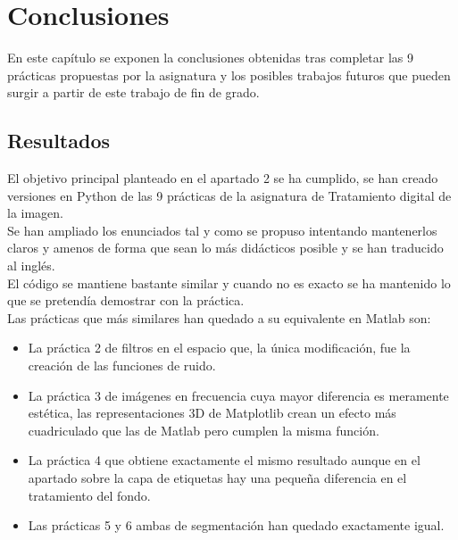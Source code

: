 \chapter{Conclusiones}
En este capítulo se exponen la conclusiones obtenidas tras completar las 9 prácticas propuestas por la asignatura y los posibles trabajos futuros que pueden surgir a partir de este trabajo de fin de grado. 

\section{Resultados}
El objetivo principal planteado en el apartado 2 se ha cumplido, se han creado versiones en Python de las 9 prácticas de la asignatura de Tratamiento digital de la imagen.\\

Se han ampliado los enunciados tal y como se propuso intentando mantenerlos claros y amenos de forma que sean lo más didácticos posible y se han traducido al inglés.\\

El código se mantiene bastante similar y cuando no es exacto se ha mantenido lo que se pretendía demostrar con la práctica.\\

Las prácticas que más similares han quedado a su equivalente en Matlab son:
\begin{itemize}
    \item La práctica 2 de filtros en el espacio que, la única modificación, fue la creación de las funciones de ruido.
    \item La práctica 3 de imágenes en frecuencia cuya mayor diferencia es meramente estética, las representaciones 3D de Matplotlib crean un efecto más cuadriculado que las de Matlab pero cumplen la misma función.
    \item La práctica 4 que obtiene exactamente el mismo resultado aunque en el apartado sobre la capa de etiquetas hay una pequeña diferencia en el tratamiento del fondo.
    \item Las prácticas 5 y 6 ambas de segmentación han quedado exactamente igual.
\end{itemize}

